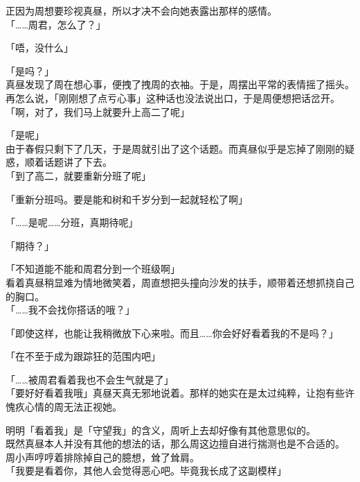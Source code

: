 正因为周想要珍视真昼，所以才决不会向她表露出那样的感情。\\

「……周君，怎么了？」

「唔，没什么」

「是吗？」\\

真昼发现了周在想心事，便拽了拽周的衣袖。于是，周摆出平常的表情摇了摇头。\\

再怎么说，「刚刚想了点亏心事」这种话也没法说出口，于是周便想把话岔开。\\

「啊，对了，我们马上就要升上高二了呢」

「是呢」\\

由于春假只剩下了几天，于是周就引出了这个话题。而真昼似乎是忘掉了刚刚的疑惑，顺着话题讲了下去。\\

「到了高二，就要重新分班了呢」

「重新分班吗。要是能和树和千岁分到一起就轻松了啊」

「……是呢……分班，真期待呢」

「期待？」

「不知道能不能和周君分到一个班级啊」\\

看着真昼稍显难为情地微笑着，周直想把头撞向沙发的扶手，顺带着还想抓挠自己的胸口。\\

「……我不会找你搭话的哦？」

「即使这样，也能让我稍微放下心来啦。而且……你会好好看着我的不是吗？」

「在不至于成为跟踪狂的范围内吧」

「……被周君看着我也不会生气就是了」\\

「要好好看着我哦」真昼天真无邪地说着。那样的她实在是太过纯粹，让抱有些许愧疚心情的周无法正视她。

明明「看着我」是「守望我」的含义，周听上去却好像有其他意思似的。\\

既然真昼本人并没有其他的想法的话，那么周这边擅自进行揣测也是不合适的。\\

周小声哼哼着排除掉自己的臆想，耸了耸肩。\\

「我要是看着你，其他人会觉得恶心吧。毕竟我长成了这副模样」\\

